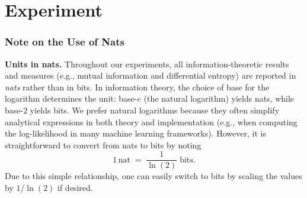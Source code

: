 \documentclass{article}
\begin{document}

\section{Experiment}
\label{sec:experiment}

\subsubsection*{Note on the Use of Nats}
\label{subsec:nats_explanation}

\noindent
\textbf{Units in nats.} Throughout our experiments, all information-theoretic results and measures (e.g., mutual information and differential entropy) are reported in \emph{nats} rather than in bits. In information theory, the choice of base for the logarithm determines the unit: base-$e$ (the natural logarithm) yields nats, while base-$2$ yields bits. We prefer natural logarithms because they often simplify analytical expressions in both theory and implementation (e.g., when computing the log-likelihood in many machine learning frameworks). However, it is straightforward to convert from nats to bits by noting
\[
1 \, \text{nat} \;=\; \frac{1}{\ln(2)} \;\text{bits}.
\]
Due to this simple relationship, one can easily switch to bits by scaling the values by $1 / \ln(2)$ if desired.
\end{document}
